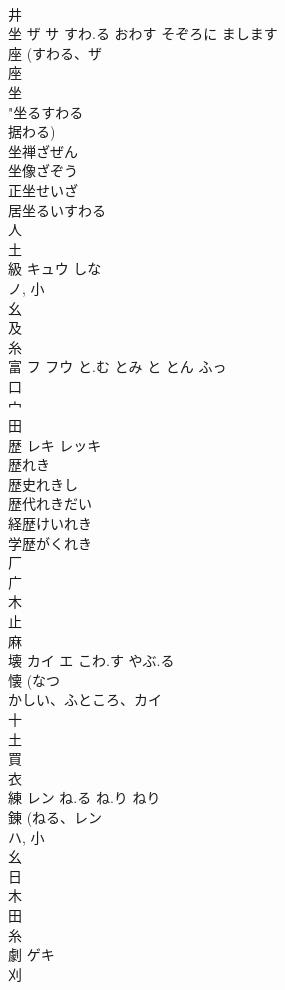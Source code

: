\documentclass[8pt]{extreport}
\begin{document}
\begin{CJK}{UTF8}{min}
\\	井 
\\	坐	ザ サ	すわ.る おわす そぞろに まします	
\\	座 (すわる、ザ 
\\	座 
\\	坐 
\\	"坐るすわる 
\\	据わる) 
\\	坐禅ざぜん 
\\	坐像ざぞう 
\\	正坐せいざ 
\\	居坐るいすわる 
\\	人 
\\	土 
\\	級	キュウ	しな	
\\	ノ, 小 
\\	幺 
\\	及 
\\	糸 
\\	富	フ フウ	と.む とみ と とん ふっ	
\\	口 
\\	宀 
\\	田 
\\	歴	レキ レッキ		
\\	歴れき
\\	歴史れきし
\\	歴代れきだい
\\	経歴けいれき
\\	学歴がくれき
\\	厂 
\\	广 
\\	木 
\\	止 
\\	麻 
\\	壊	カイ エ	こわ.す やぶ.る	
\\	懐 (なつ
\\	かしい、ふところ、カイ 
\\	十 
\\	土 
\\	買 
\\	衣 
\\	練	レン	ね.る ね.り ねり	
\\	錬 (ねる、レン 
\\	ハ, 小 
\\	幺 
\\	日 
\\	木 
\\	田 
\\	糸 
\\	劇	ゲキ		
\\	刈 

\end{CJK}
\end{document}
